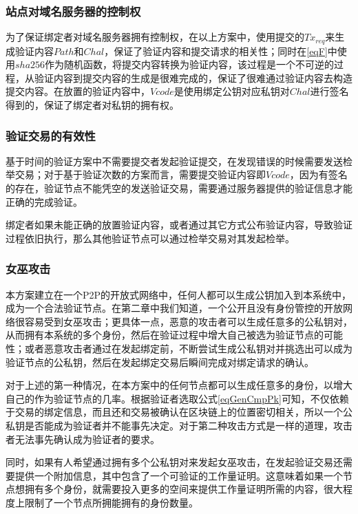 \subsubsection{站点对域名服务器的控制权}

为了保证绑定者对域名服务器拥有控制权，在以上方案中，使用提交的$Tx_{req}$来生成验证内容$Path$和$Chal$，保证了验证内容和提交请求的相关性；同时在\eqref{eqF}中使用$sha256$作为随机函数，将提交内容转换为验证内容，该过程是一个不可逆的过程，从验证内容到提交内容的生成是很难完成的，保证了很难通过验证内容去构造提交内容。在放置的验证内容中，$Vcode$是使用绑定公钥对应私钥对$Chal$进行签名得到的，保证了绑定者对私钥的拥有权。


\subsubsection{验证交易的有效性}

基于时间的验证方案中不需要提交者发起验证提交，在发现错误的时候需要发送检举交易；对于基于验证次数的方案而言，需要提交验证内容即$Vcode$，因为有签名的存在，验证节点不能凭空的发送验证交易，需要通过服务器提供的验证信息才能正确的完成验证。

绑定者如果未能正确的放置验证内容，或者通过其它方式公布验证内容，导致验证过程依旧执行，那么其他验证节点可以通过检举交易对其发起检举。


\subsubsection{女巫攻击}

本方案建立在一个P2P的开放式网络中，任何人都可以生成公钥加入到本系统中，成为一个合法验证节点。在第二章中我们知道，一个公开且没有身份管控的开放网络很容易受到女巫攻击；更具体一点，恶意的攻击者可以生成任意多的公私钥对，从而拥有本系统的多个身份，然后在验证过程中增大自己被选为验证节点的可能性；或者恶意攻击者通过在发起绑定前，不断尝试生成公私钥对并挑选出可以成为验证节点的公私钥，然后在发起绑定交易后瞬间完成对绑定请求的确认。

对于上述的第一种情况，在本方案中的任何节点都可以生成任意多的身份，以增大自己的作为验证节点的几率。根据验证者选取公式\ref{eqGenCmpPk}可知，不仅依赖于交易的绑定信息，而且还和交易被确认在区块链上的位置密切相关，所以一个公私钥是否能成为验证者并不能事先决定。对于第二种攻击方式是一样的道理，攻击者无法事先确认成为验证者的要求。

同时，如果有人希望通过拥有多个公私钥对来发起女巫攻击，在发起验证交易还需要提供一个附加信息，其中包含了一个可验证的工作量证明。这意味着如果一个节点想拥有多个身份，就需要投入更多的空间来提供工作量证明所需的内容，很大程度上限制了一个节点所拥能拥有的身份数量。                          

